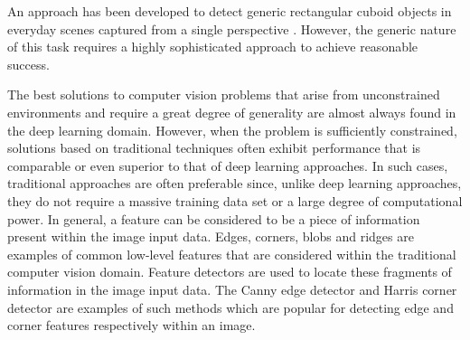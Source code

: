 
An approach has been developed to detect generic rectangular cuboid objects in everyday scenes captured from a single perspective \cite{Xiao:Localizing_3D_Cuboids}. However, the generic nature of this task requires a highly sophisticated approach to achieve reasonable success. 


The best solutions to computer vision problems that arise from unconstrained environments and require a great degree of generality are almost always found in the deep learning domain. However, when the problem is sufficiently constrained, solutions based on traditional techniques often exhibit performance that is comparable or even superior to that of deep learning approaches. In such cases, traditional approaches are often preferable since, unlike deep learning approaches, they do not require a massive training data set or a large degree of computational power. In general, a feature can be considered to be a piece of information present within the image input data. Edges, corners, blobs and ridges are examples of common low-level features that are considered within the traditional computer vision domain. Feature detectors are used to locate these fragments of information in the image input data. The Canny edge detector \cite{Canny:Computational_Edge_Detection} and Harris corner detector \cite{ Harris:Corner_and_Edge_Detector} are examples of such methods which are popular for detecting edge and corner features respectively within an image.

